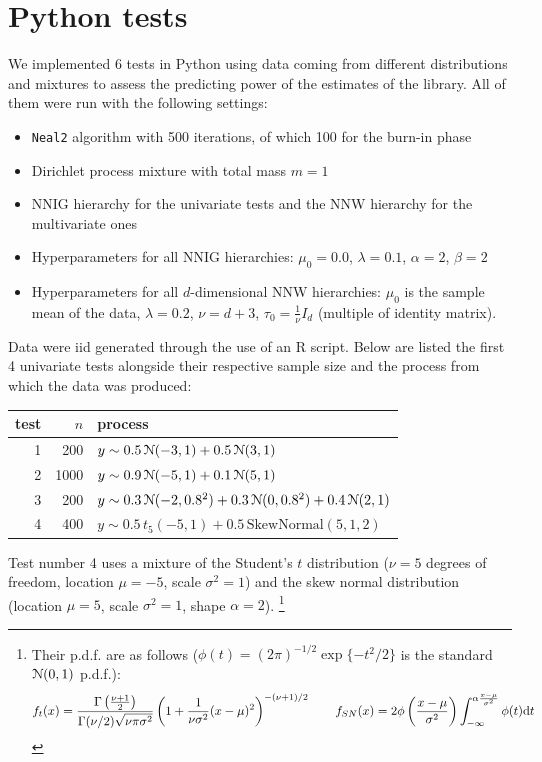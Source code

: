 \chapter{Python tests}\label{chap-py-test}
We implemented 6 tests in Python using data coming from different distributions and mixtures to assess the predicting power of the estimates of the library.
All of them were run with the following settings:
\begin{itemize}
	\item \verb|Neal2| algorithm with 500 iterations, of which 100 for the burn-in phase
	\item Dirichlet process mixture with total mass $m=1$
	\item NNIG hierarchy for the univariate tests and the NNW hierarchy for the multivariate ones
	\item Hyperparameters for all NNIG hierarchies: $\mu_0 = 0.0$, $\lambda = 0.1$, $\alpha = 2$, $\beta = 2$
	\item Hyperparameters for all $d$-dimensional NNW hierarchies: $\mu_0$ is the sample mean of the data, $\lambda = 0.2$, $\nu = d + 3$, $\tau_0 = \frac{1}{\nu} I_d$ (multiple of identity matrix).
\end{itemize}
Data were iid generated through the use of an R script.
Below are listed the first 4 univariate tests alongside their respective sample size and the process from which the data was produced:
\begin{center}
	\begin{tabular}{r|r|l}
		test & $n$ & process \\ \hline
		1 &  200 & $y \sim 0.5 \, \mathcal N(-3, 1) + 0.5 \, \mathcal N(3, 1)$ \\
		2 & 1000 & $y \sim 0.9 \, \mathcal N(-5, 1) + 0.1 \, \mathcal N(5, 1)$ \\
		3 &  200 & $y \sim 0.3 \, \mathcal N(-2, 0.8^2) + 0.3 \, \mathcal N(0, 0.8^2) + 0.4 \, \mathcal N(2, 1)$ \\
		4 &  400 & $y \sim 0.5 \, t_5(-5, 1 ) + 0.5 \, \text{SkewNormal}(5, 1, 2)$
	\end{tabular}
\end{center}
Test number 4 uses a mixture of the Student's $t$ distribution ($\nu=5$ degrees of freedom, location $\mu=-5$, scale $\sigma^2 = 1$) and the skew normal distribution (location $\mu=5$, scale $\sigma^2=1$, shape $\alpha=2$). \footnote{Their p.d.f. are as follows ($\phi(t) = (2\pi)^{-1/2} \exp\{-t^2/2\}$ is the standard $\mathcal N(0,1)$ p.d.f.):
$$ f_t(x) = \frac{\Gamma\left(\frac{\nu+1}{2}\right)}{\Gamma(\nu/2) \sqrt{\nu \pi \sigma^2}} \left( 
1+\frac{1}{\nu \sigma^2}(x-\mu)^2 \right)^{-(\nu+1)/2} \qquad
f_{SN}(x) = 2 \phi\left(\frac{x-\mu}{\sigma^2}\right) \int_{-\infty}^{\alpha \frac{x-\mu}{\sigma^2}} \phi(t) \mathrm d t
$$}

